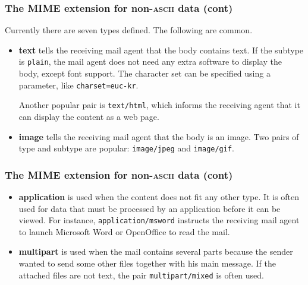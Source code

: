 %
\begin{frame}[containsverbatim]
\frametitle{The MIME extension for non-\textsc{ascii} data (cont)}

Currently there are seven types defined. The following are common.
\begin{itemize}

  \item \textbf{text} tells the receiving mail agent that the body
  contains text. If the subtype is \verb+plain+, the mail agent does
  not need any extra software to display the body, except font
  support. The character set can be specified using a parameter, like
  \verb+charset=euc-kr+.

  Another popular pair is \verb+text/html+, which informs the
  receiving agent that it can display the content as a web page.

  \item \textbf{image} tells the receiving mail agent that the body
  is an image. Two pairs of type and subtype are popular:
  \verb+image/jpeg+ and \verb+image/gif+.

\end{itemize}

\end{frame}

%
\begin{frame}[containsverbatim]
\frametitle{The MIME extension for non-\textsc{ascii} data (cont)}

\begin{itemize}

  \item \textbf{application} is used when the content does not fit
  any other type. It is often used for data that must be processed by
  an application before it can be viewed. For instance,
  \verb+application/msword+ instructs the receiving mail agent to
  launch Microsoft Word or OpenOffice to read the mail.

  \item \textbf{multipart} is used when the mail contains several
  parts because the sender wanted to send some other files together
  with his main message. If the attached files are not text, the pair
  \verb+multipart/mixed+ is often used.

\end{itemize}

\end{frame}


